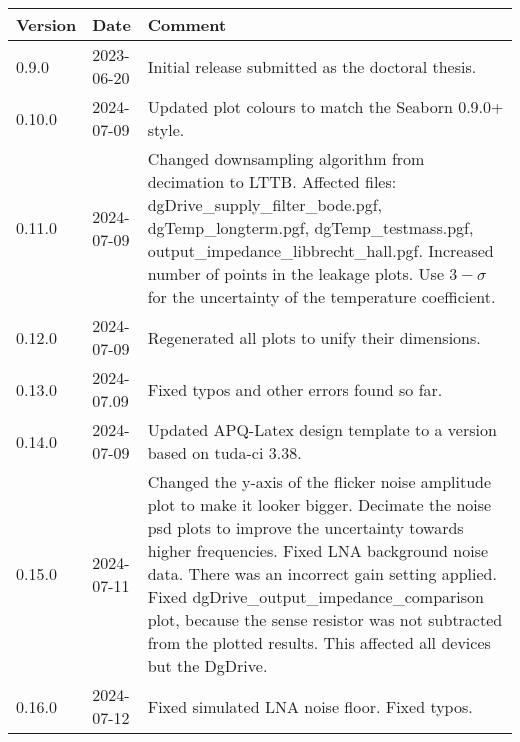 \begin{table}[h]
    \centering
    \begin{tabularx}{0.95\textwidth}{ll>{\raggedright\arraybackslash}X}
        Version& Date& Comment\\
        \hline
        0.9.0 &2023-06-20 & Initial release submitted as the doctoral thesis.\\
        0.10.0 &2024-07-09 & Updated plot colours to match the Seaborn 0.9.0+ style.\\
        0.11.0 &2024-07-09 & Changed downsampling algorithm from decimation to LTTB. Affected files: dgDrive\_supply\_filter\_bode.pgf, dgTemp\_longterm.pgf, dgTemp\_testmass.pgf, output\_impedance\_libbrecht\_hall.pgf. Increased number of points in the leakage plots. Use $3-\sigma$ for the uncertainty of the temperature coefficient.\\
        0.12.0 &2024-07-09 & Regenerated all plots to unify their dimensions.\\
        0.13.0 &2024-07.09 & Fixed typos and other errors found so far.\\
        0.14.0 &2024-07-09 & Updated APQ-Latex design template to a version based on tuda-ci 3.38.\\
        0.15.0 &2024-07-11 & Changed the y-axis of the flicker noise amplitude plot to make it looker bigger. Decimate the noise psd plots to improve the uncertainty towards higher frequencies. Fixed LNA background noise data. There was an incorrect gain setting applied. Fixed dgDrive\_output\_impedance\_comparison plot, because the sense resistor was not subtracted from the plotted results. This affected all devices but the DgDrive.\\
        0.16.0 &2024-07-12 & Fixed simulated LNA noise floor. Fixed typos.
    \end{tabularx}
\end{table}
